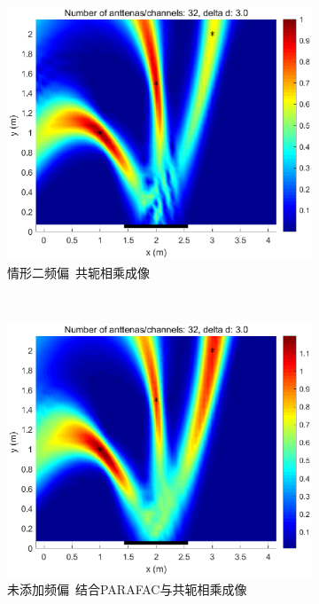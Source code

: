 \begin{figure}[H]
\begin{subfigure}[t]{.3\linewidth}
    \includegraphics[width=1\textwidth]{figures/compare/CM_freq2.eps}
    \caption{情形二频偏~共轭相乘成像}
  \end{subfigure}
  \\
  \begin{subfigure}[t]{.3\linewidth}
    \centering
    \includegraphics[width=1\textwidth]{figures/compare/TPF_CM_without_freq.eps}
    \caption{未添加频偏~结合PARAFAC与共轭相乘成像}
  \end{subfigure}
  \begin{subfigure}[t]{.3\linewidth}

\end{subfigure}
\end{figure}
